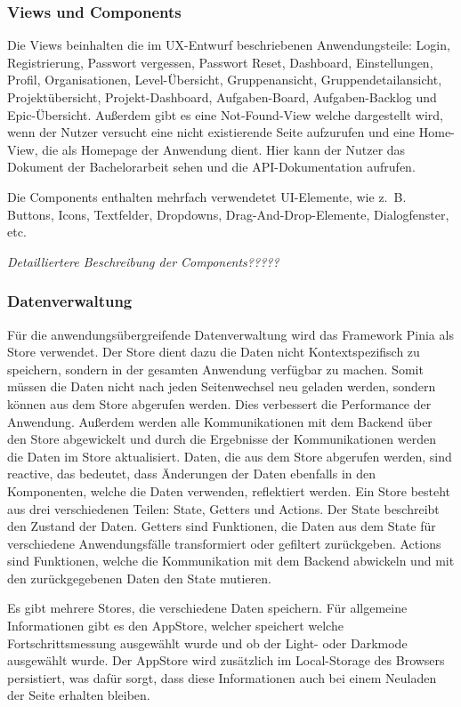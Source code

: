 \subsubsection{Views und Components}
Die Views beinhalten die im UX-Entwurf beschriebenen Anwendungsteile: Login, Registrierung, Passwort vergessen, Passwort Reset, Dashboard, Einstellungen, Profil, Organisationen, Level-Übersicht, Gruppenansicht, Gruppendetailansicht, Projektübersicht, Projekt-Dashboard, Aufgaben-Board, Aufgaben-Backlog und Epic-Übersicht. Außerdem gibt es eine Not-Found-View welche dargestellt wird, wenn der Nutzer versucht eine nicht existierende Seite aufzurufen und eine Home-View, die als Homepage der Anwendung dient. Hier kann der Nutzer das Dokument der Bachelorarbeit sehen und die API-Dokumentation aufrufen.

Die Components enthalten mehrfach verwendetet UI-Elemente, wie z. B. Buttons, Icons, Textfelder, Dropdowns, Drag-And-Drop-Elemente, Dialogfenster, etc.

\emph{Detailliertere Beschreibung der Components?????}

\subsubsection{Datenverwaltung}
Für die anwendungsübergreifende Datenverwaltung wird das Framework Pinia als Store verwendet. Der Store dient dazu die Daten nicht Kontextspezifisch zu speichern, sondern in der gesamten Anwendung verfügbar zu machen. Somit müssen die Daten nicht nach jeden Seitenwechsel neu geladen werden, sondern können aus dem Store abgerufen werden. Dies verbessert die Performance der Anwendung. Außerdem werden alle Kommunikationen mit dem Backend über den Store abgewickelt und durch die Ergebnisse der Kommunikationen werden die Daten im Store aktualisiert. Daten, die aus dem Store abgerufen werden, sind reactive, das bedeutet, dass Änderungen der Daten ebenfalls in den Komponenten, welche die Daten verwenden, reflektiert werden. Ein Store besteht aus drei verschiedenen Teilen: State, Getters und Actions. Der State beschreibt den Zustand der Daten. Getters sind Funktionen, die Daten aus dem State für verschiedene Anwendungsfälle transformiert oder gefiltert zurückgeben. Actions sind Funktionen, welche die Kommunikation mit dem Backend abwickeln und mit den zurückgegebenen Daten den State mutieren.

Es gibt mehrere Stores, die verschiedene Daten speichern. Für allgemeine Informationen gibt es den AppStore, welcher speichert welche Fortschrittsmessung ausgewählt wurde und ob der Light- oder Darkmode ausgewählt wurde. Der AppStore wird zusätzlich im Local-Storage des Browsers persistiert, was dafür sorgt, dass diese Informationen auch bei einem Neuladen der Seite erhalten bleiben.

